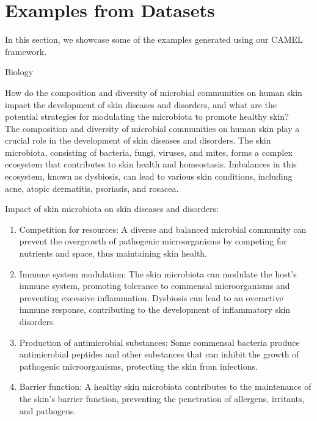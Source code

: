 \clearpage


\clearpage
\section{Examples from Datasets}

In this section, we showcase some of the examples generated using our CAMEL framework.

\begin{AIBoxBreak}{Biology}

	\usermsg How do the composition and diversity of microbial communities on human skin impact the development of skin diseases and disorders, and what are the potential strategies for modulating the microbiota to promote healthy skin?\\

	\assistantmsg The composition and diversity of microbial communities on human skin play a crucial role in the development of skin diseases and disorders. The skin microbiota, consisting of bacteria, fungi, viruses, and mites, forms a complex ecosystem that contributes to skin health and homeostasis. Imbalances in this ecosystem, known as dysbiosis, can lead to various skin conditions, including acne, atopic dermatitis, psoriasis, and rosacea.

	Impact of skin microbiota on skin diseases and disorders:

	\begin{enumerate}
		\item Competition for resources: A diverse and balanced microbial community can prevent the overgrowth of pathogenic microorganisms by competing for nutrients and space, thus maintaining skin health.

		\item Immune system modulation: The skin microbiota can modulate the host's immune system, promoting tolerance to commensal microorganisms and preventing excessive inflammation. Dysbiosis can lead to an overactive immune response, contributing to the development of inflammatory skin disorders.

		\item Production of antimicrobial substances: Some commensal bacteria produce antimicrobial peptides and other substances that can inhibit the growth of pathogenic microorganisms, protecting the skin from infections.

		\item Barrier function: A healthy skin microbiota contributes to the maintenance of the skin's barrier function, preventing the penetration of allergens, irritants, and pathogens.
	\end{enumerate}


\end{AIBoxBreak}
